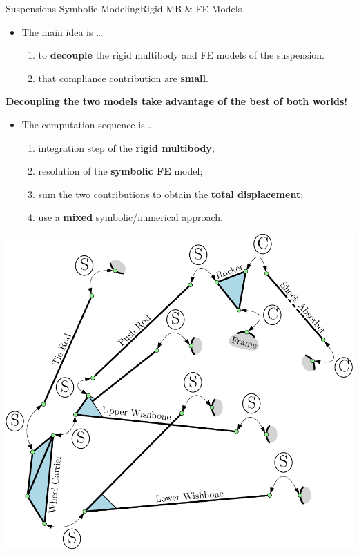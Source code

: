 \begin{frame}{Suspensions Symbolic Modeling}{Rigid \ac{MB} \& \ac{FE} Models}
  \begin{minipage}[c]{0.55\linewidth}
    \begin{itemize}
      \item The main idea is \dots
      \begin{enumerate}
        \item to \textbf{decouple} the rigid multibody and \ac{FE} models of the suspension.
        \item that compliance contribution are \textbf{small}.
      \end{enumerate}
    \end{itemize}
    \begin{center}\begin{minipage}{7.0cm}\begin{block}{}
      \centering
      \textcolor{fg_sl_color}{\textbf{Decoupling the two models take advantage of the best of both worlds!}}
    \end{block}\end{minipage}\vspace{1.0em}\end{center}
    \begin{itemize}
      \item The computation sequence is \dots
      \begin{enumerate}
        \item integration step of the \textbf{rigid multibody};
        \item resolution of the \textbf{symbolic \ac{FE}} model;
        \item sum the two contributions to obtain the \textbf{total displacement}:
        \item  use a \textbf{mixed} symbolic/numerical approach.
      \end{enumerate}
    \end{itemize}
  \end{minipage}
  \begin{minipage}[c]{0.40\linewidth}
    \includegraphics[width=1.0\textwidth]{./figures/constraints.pdf}

\end{minipage}
\end{frame}
